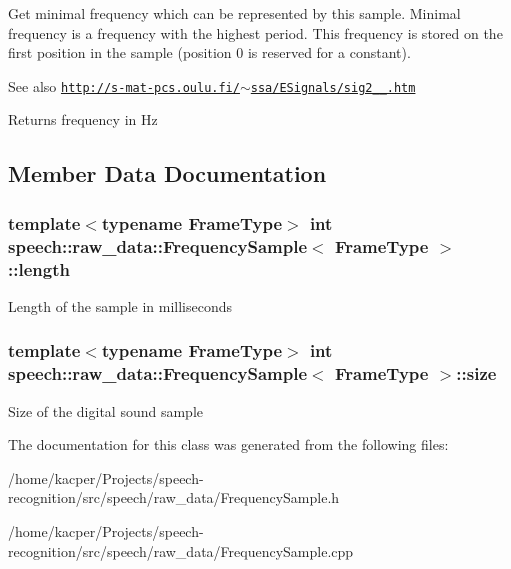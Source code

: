 Get minimal frequency which can be represented by this sample. Minimal frequency is a frequency with the highest period. This frequency is stored on the first position in the sample (position 0 is reserved for a constant). \begin{DoxySeeAlso}{See also}
\href{http://s-mat-pcs.oulu.fi/~ssa/ESignals/sig2_2_4.htm}{\tt http\+://s-\/mat-\/pcs.\+oulu.\+fi/$\sim$ssa/\+E\+Signals/sig2\+\_\+\_.\+htm}
\end{DoxySeeAlso}
\begin{DoxyReturn}{Returns}
frequency in Hz 
\end{DoxyReturn}


\subsection{Member Data Documentation}
\hypertarget{classspeech_1_1raw__data_1_1FrequencySample_a1be9745b2f888a25e7c0ace49ce54e71}{
\subsubsection[{length}]{\setlength{\rightskip}{0pt plus 5cm}template$<$typename Frame\+Type$>$ int {\bf speech\+::raw\+\_\+data\+::\+Frequency\+Sample}$<$ Frame\+Type $>$\+::length\hspace{0.3cm}{\ttfamily [protected]}}}\label{classspeech_1_1raw__data_1_1FrequencySample_a1be9745b2f888a25e7c0ace49ce54e71}
Length of the sample in milliseconds \hypertarget{classspeech_1_1raw__data_1_1FrequencySample_a40ef53bb2ffd8c51a46ada712a8b879d}{
\subsubsection[{size}]{\setlength{\rightskip}{0pt plus 5cm}template$<$typename Frame\+Type$>$ int {\bf speech\+::raw\+\_\+data\+::\+Frequency\+Sample}$<$ Frame\+Type $>$\+::size\hspace{0.3cm}{\ttfamily [protected]}}}\label{classspeech_1_1raw__data_1_1FrequencySample_a40ef53bb2ffd8c51a46ada712a8b879d}
Size of the digital sound sample 

The documentation for this class was generated from the following files\+:\begin{DoxyCompactItemize}
\item 
/home/kacper/\+Projects/speech-\/recognition/src/speech/raw\+\_\+data/Frequency\+Sample.\+h\item 
/home/kacper/\+Projects/speech-\/recognition/src/speech/raw\+\_\+data/Frequency\+Sample.\+cpp\end{DoxyCompactItemize}
